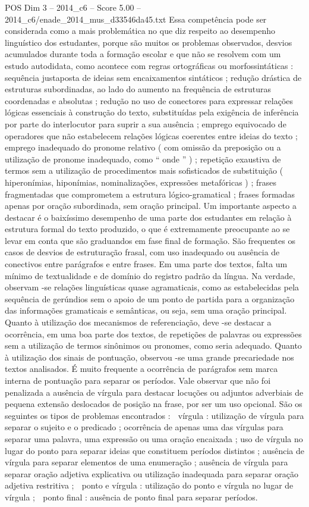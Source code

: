 \begin{textsample}{POS Dim 3 – 2014\_c6 – Score 5.00 – 2014\_c6/enade\_2014\_mus\_d33546da45.txt}
Essa competência pode ser considerada como a mais problemática no que diz respeito ao desempenho linguístico dos estudantes, porque são muitos os problemas observados, desvios acumulados durante toda a formação escolar e que não se resolvem com um estudo autodidata, como acontece com regras ortográficas ou morfossintáticas : sequência justaposta de ideias sem encaixamentos sintáticos ; redução drástica de estruturas subordinadas, ao lado do aumento na frequência de estruturas coordenadas e absolutas ; redução no uso de conectores para expressar relações lógicas essenciais à construção do texto, substituídas pela exigência de inferência por parte do interlocutor para suprir a sua ausência ; emprego equivocado de operadores que não estabelecem relações lógicas coerentes entre ideias do texto ; emprego inadequado do pronome relativo ( com omissão da preposição ou a utilização de pronome inadequado, como “ onde ” ) ; repetição exaustiva de termos sem a utilização de procedimentos mais sofisticados de substituição ( hiperonímias, hiponímias, nominalizações, expressões metafóricas ) ; frases fragmentadas que comprometem a estrutura lógico-gramatical ; frases formadas apenas por oração subordinada, sem oração principal.
Um importante aspecto a destacar é o baixíssimo desempenho de uma parte dos estudantes em relação à estrutura formal do texto produzido, o que é extremamente preocupante ao se levar em conta que são graduandos em fase final de formação.
São frequentes os casos de desvios de estruturação frasal, com uso inadequado ou ausência de conectivos entre parágrafos e entre frases.
Em uma parte dos textos, falta um mínimo de textualidade e de domínio do registro padrão da língua.
Na verdade, observam -se relações linguísticas quase agramaticais, como as estabelecidas pela sequência de gerúndios sem o apoio de um ponto de partida para a organização das informações gramaticais e semânticas, ou seja, sem uma oração principal.
Quanto à utilização dos mecanismos de referenciação, deve -se destacar a ocorrência, em uma boa parte dos textos, de repetições de palavras ou expressões sem a utilização de termos sinônimos ou pronomes, como seria adequado.
Quanto à utilização dos sinais de pontuação, observou -se uma grande precariedade nos textos analisados.
É muito frequente a ocorrência de parágrafos sem marca interna de pontuação para separar os períodos.
Vale observar que não foi penalizada a ausência de vírgula para destacar locuções ou adjuntos adverbiais de pequena extensão deslocados de posição na frase, por ser um uso opcional.
São os seguintes os tipos de problemas encontrados :  vírgula : utilização de vírgula para separar o sujeito e o predicado ; ocorrência de apenas uma das vírgulas para separar uma palavra, uma expressão ou uma oração encaixada ; uso de vírgula no lugar do ponto para separar ideias que constituem períodos distintos ; ausência de vírgula para separar elementos de uma enumeração ; ausência de vírgula para separar oração adjetiva explicativa ou utilização inadequada para separar oração adjetiva restritiva ;  ponto e vírgula : utilização do ponto e vírgula no lugar de vírgula ;  ponto final : ausência de ponto final para separar períodos.

\end{textsample}
